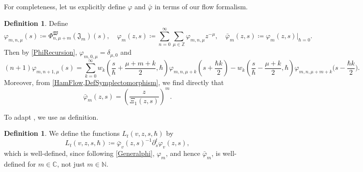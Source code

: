 \documentclass[10pt,a4paper,oneside,no-math,reqno]{amsart}%
\theoremstyle{plain}
\theoremstyle{definition}
\newtheorem{definition}[theorem]{Definition}
\theoremstyle{remark}
\numberwithin{equation}{section}
\renewcommand{\phi}{\varphi}
\newcommand{\mb}[1]{\mathbb{#1}}
\newcommand{\mf}[1]{\mathfrak{#1}}
\newcommand{\mc}[1]{\mathcal{#1}}
\newcommand{\1}{\mathds{1}}
\newcommand{\N}{\mb{N}}
\newcommand{\C}{\mb{C}}
\newcommand{\Z}{\mb{Z}}
\newcommand{\<}{\langle}
\renewcommand{\>}{\rangle}
\newcommand{\del}{\partial}
\begin{document}


For completeness, let us explicitly define $ \phi$ and $ \bar{\phi}$ in terms of our flow formalism.

\begin{definition}\label{Defsphi}
    Define 
    \begin{equation}
        \phi_{m,n,\mu}(s)
        \coloneqq
        \Phi^{\mf{W}}_{n,\mu+m} (\mf{J}_{m})(s) ,
        \quad
        \phi_m (z,s)
        \coloneqq
        \sum_{n=0}^\infty \sum_{\mu \in \Z} \phi_{m,n,\mu} z^{-\mu} ,
        \quad
        \bar{\phi}_m(z,s)
        \coloneqq
        \phi_m (z,s)\Big|_{\hbar = 0}.
    \end{equation}
    Then by \cref{PhiRecursion}, $ \phi_{m,0,\mu} = \delta_{\mu, 0} $ and
    \begin{equation}\label{Generalphi}
		(n+1) \phi_{m,n+1,\mu} (s) 
		=
		\sum_{k = 0}^\infty w_k (\frac{s}{\hbar} + \frac{\mu+m+k}{2}, \hbar ) \phi_{m,n, \mu+k} ( s + \frac{\hbar k}{2}) - w_k ( \frac{s}{\hbar} - \frac{\mu+k}{2}, \hbar ) \phi_{m,n,\mu+m+k} \big( s - \frac{\hbar k}{2}\big) .
	\end{equation}
    Moreover, from \cref{HamFlow,DefSymplectomorphism}, we find directly that
    \begin{equation}\label{phiAsRatio}
        \bar{\phi}_{m} (z,s) = (\frac{z}{\Xi_1 (z,s)})^{m}.
    \end{equation}
\end{definition}

To adapt \cite[Sections 4.3-4]{BDKS22}, we use \cite[Lemma 4.6]{BDKS22} as definition.


\begin{definition}
	We define the functions $ L_t (v,z, s, \hbar)$ by
	\begin{equation}\label{FunctionL}
		L_t (v,z,s,\hbar) \coloneqq \bar{\phi}_v(z,s)^{-1} \del_s^t \phi_v(z,s),
	\end{equation}
	which is well-defined, since following \cref{Generalphi}, $ \phi_m$, and hence $ \bar{\phi}_m$, is well-defined for $ m \in \C$, not just $m \in \N$.
\end{definition}
\end{document}

